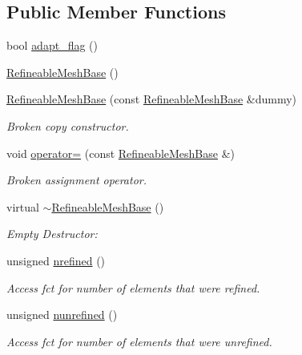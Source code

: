\subsection*{Public Member Functions}
\begin{DoxyCompactItemize}
\item 
bool \hyperlink{classoomph_1_1RefineableMeshBase_a82b2d84c2845092acb3714336f65f72d}{adapt\+\_\+flag} ()
\item 
\hyperlink{classoomph_1_1RefineableMeshBase_a2b6e95347d4ffcc916c3d760f6e94a89}{Refineable\+Mesh\+Base} ()
\item 
\hyperlink{classoomph_1_1RefineableMeshBase_a4de75dc90274e3ebd889b9ae680ef1a5}{Refineable\+Mesh\+Base} (const \hyperlink{classoomph_1_1RefineableMeshBase}{Refineable\+Mesh\+Base} \&dummy)
\begin{DoxyCompactList}\small\item\em Broken copy constructor. \end{DoxyCompactList}\item 
void \hyperlink{classoomph_1_1RefineableMeshBase_a8d88b478b38015e7d37ca5bbfe216b80}{operator=} (const \hyperlink{classoomph_1_1RefineableMeshBase}{Refineable\+Mesh\+Base} \&)
\begin{DoxyCompactList}\small\item\em Broken assignment operator. \end{DoxyCompactList}\item 
virtual \hyperlink{classoomph_1_1RefineableMeshBase_ace69036132a97dd34dc9969a0db5b502}{$\sim$\+Refineable\+Mesh\+Base} ()
\begin{DoxyCompactList}\small\item\em Empty Destructor\+: \end{DoxyCompactList}\item 
unsigned \hyperlink{classoomph_1_1RefineableMeshBase_abc1285956019d530610a3d9e0ff770e8}{nrefined} ()
\begin{DoxyCompactList}\small\item\em Access fct for number of elements that were refined. \end{DoxyCompactList}\item 
unsigned \hyperlink{classoomph_1_1RefineableMeshBase_a1d3d3c72721e97e4fa24e1d7dc13f2b5}{nunrefined} ()
\begin{DoxyCompactList}\small\item\em Access fct for number of elements that were unrefined. \end{DoxyCompactList}\item 

\end{DoxyCompactItemize}
